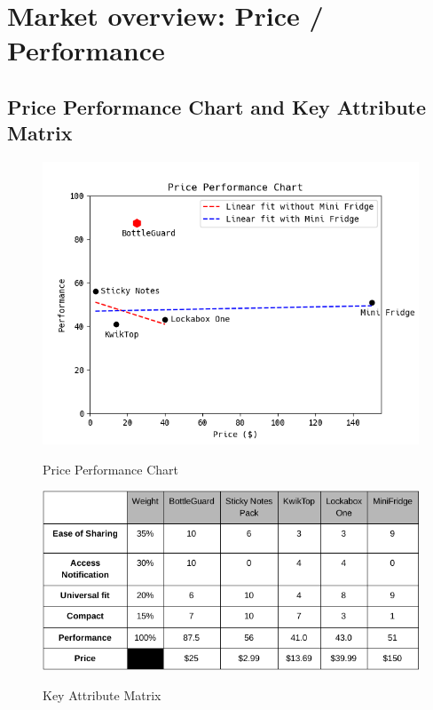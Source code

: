 \documentclass[12pt]{article}
\begin{document}
	\section*{Market overview: Price / Performance}
	\subsection*{Price Performance Chart and Key Attribute Matrix}
	\begin{figure}[H]
		\includegraphics[width=\textwidth]{e185ew.png}
		\label{fig:ppc}
		\caption{Price Performance Chart}
	\end{figure}
\begin{figure}[H]
	\includegraphics[width=\textwidth]{kam.png}
	\label{fig:kam}
	\caption{Key Attribute Matrix}
\end{figure}
\end{document}
